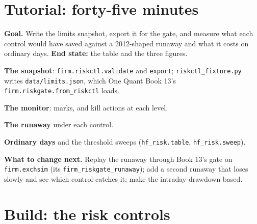 \section{Tutorial: forty-five minutes}\label{tut:hf:risk-controls:tut}

\begin{tutorial}
\textbf{Goal.} Write the limits snapshot, export it for the gate, and measure what each control would have saved against a 2012-shaped runaway and
what it costs on ordinary days. \textbf{End state:} the table and the three figures.
\begin{tutsteps}
\item \textbf{The snapshot}: \texttt{firm.riskctl.validate} and \texttt{export}; \texttt{riskctl\_fixture.py} writes
\texttt{data/limits.json}, which One Quant Book 13's \texttt{firm.riskgate.from\_riskctl} loads.
\item \textbf{The monitor}: marks,  and kill actions at each level.
\label{lst:hf:risk-controls:monitor}
\item \textbf{The runaway} under each control.
\label{lst:hf:risk-controls:runaway}
\item \textbf{Ordinary days} and the threshold sweeps (\texttt{hf\_risk.table}, \texttt{hf\_risk.sweep}).
\end{tutsteps}
\textbf{What to change next.} Replay the runaway through Book 13's gate on \texttt{firm.exchsim} (its \texttt{firm\_riskgate\_runaway}); add a
second runaway that loses slowly and see which control catches it; make the  intraday-drawdown based.
\end{tutorial}

\section{Build: the risk controls}\label{bld:hf:risk-controls:riskctl}

